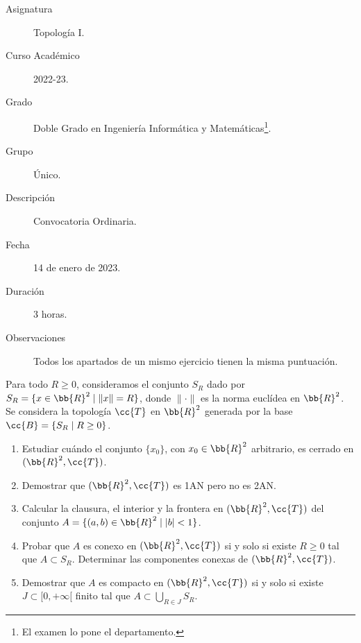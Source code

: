 \documentclass[12pt]{article}
\newcommand{\T}[0]{\cc{T}}
\begin{document}

    
    

    \begin{description}
        \item[Asignatura] Topología I.
        \item[Curso Académico] 2022-23.
        \item[Grado] Doble Grado en Ingeniería Informática y Matemáticas\footnote{El examen lo pone el departamento.}.
        \item[Grupo] Único.
        \item[Descripción] Convocatoria Ordinaria.
        \item[Fecha] 14 de enero de 2023.
        \item[Duración] 3 horas.
        \item[Observaciones] Todos los apartados de un mismo ejercicio tienen la misma puntuación.
    
    \end{description}
    \newpage
    
    \begin{ejercicio}[4.5 puntos]
        Para todo $R\geq 0$, consideramos el conjunto $S_R$ dado por $S_R= \{x\in \bb{R}^2\mid \|x\|= R\}$, donde $\|\cdot\|$ es la norma euclídea en $\bb{R}^2$.
        Se considera la topología $\T$ en $\bb{R}^2$ generada por la base $\cc{B}= \{S_R\mid R\geq 0\}$.
        \begin{enumerate}
            \item Estudiar cuándo el conjunto $\{x_0\}$, con $x_0\in \bb{R}^2$ arbitrario, es cerrado en $(\bb{R}^2,\T)$.
            \item Demostrar que $(\bb{R}^2,\T)$ es 1AN pero no es 2AN.
            \item Calcular la clausura, el interior y la frontera en $(\bb{R}^2,\T)$ del conjunto $A=\{(a,b)\in \bb{R}^2\mid |b|<1\}$.
            \item Probar que $A$ es conexo en $(\bb{R}^2,\T)$ si y solo si existe $R\geq 0$ tal que $A\subset S_R$. Determinar
            las componentes conexas de $(\bb{R}^2,\T)$.
            \item Demostrar que $A$ es compacto en $(\bb{R}^2,\T)$ si y solo si existe $J\subset [0,+\infty[$ finito tal que
            $A\subset \bigcup\limits_{R\in J}S_R$.
        \end{enumerate}
    \end{ejercicio}
\end{document}
